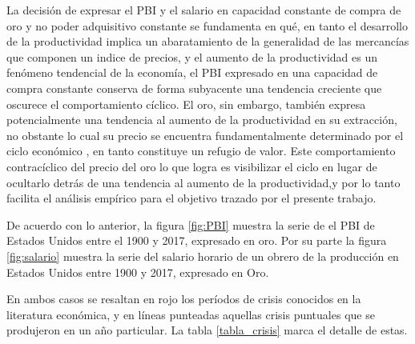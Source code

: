 \documentclass[a4paper]{article}
\begin{document}
La decisión de expresar el PBI y el salario en capacidad constante de compra de oro y no poder adquisitivo constante se fundamenta en qué, en tanto el desarrollo de la productividad implica un abaratamiento de la generalidad de las mercancías que componen un indice de precios, y el aumento de la productividad es un fenómeno tendencial de la economía, el PBI expresado en una capacidad de compra constante conserva de forma subyacente una tendencia creciente que oscurece el comportamiento cíclico. El oro, sin embargo, también expresa potencialmente una tendencia al aumento de la productividad en su extracción, no obstante lo cual su precio se encuentra fundamentalmente determinado por el ciclo económico , en tanto constituye un refugio de valor. Este comportamiento contracíclico del precio del oro lo que logra es visibilizar el ciclo en lugar de ocultarlo detrás de una tendencia al aumento de la productividad,y por lo tanto facilita el análisis empírico para el objetivo trazado por el presente trabajo.

De acuerdo con lo anterior, la figura \ref{fig:PBI} muestra la serie de el PBI de Estados Unidos entre el 1900 y 2017, expresado en oro. Por su parte la figura \ref{fig:salario} muestra la serie del salario horario de un obrero de la producción en Estados Unidos entre 1900 y 2017, expresado en Oro.

 En ambos casos se resaltan en rojo los períodos de crisis conocidos en la literatura económica, y en líneas punteadas aquellas crisis puntuales que se produjeron en un año particular. La tabla \ref{tabla_crisis} marca el detalle de estas.
\end{document}
